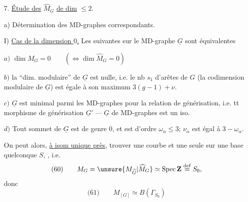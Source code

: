 7. \uline{Étude des}  $\widehat M_G$  \uline{de dim} $\leq 2$.

a) Détermination des MD-graphes correspondants.

I) \uline{Cas de la dimension $0$.} Les   suivantes sur le MD-graphe $\underline G$ sont équivalentes

$a)$ $\dim M_G=0\qquad(\Longleftrightarrow\dim\widehat M_G=0)$

$b)$  la ``dim. modulaire'' de $\underline G$ est nulle, i.e. le nb $s_1$ d'arêtes de  $G$ (la codimension modulaire de $\underline G$) est égale à son maximum $3(g-1)+\nu$.

$c)$  $\underline G$ est minimal parmi les MD-graphes pour la relation de générisation, i.e. tt morphisme de générisation $\underline G'\mathbin{\text{---}}\underline G$ de MD-graphes est un iso.

$d)$ Tout sommet \inserted{$\alpha$} de $\underline G$ est de genre $0$, et est d'ordre  $\omega_\alpha\leq3$;   $\nu_\alpha$ est égal à $3-\omega_\alpha$.

On peut alors, \uline{à isom unique près}, trouver une courbe   et une seule sur une base quelconque $S$, , i.e.
\[
\text{(60)}\qquad M_G=\unsure{M_{\widehat G}|\widehat M_G}\simeq\operatorname{Spec}\mathbf Z\overset{\mathrm{def}}=S_0,
\]
donc
\[
\text{(61)}\qquad M_{[G]}\simeq B(\Gamma_{S_0})
\]
